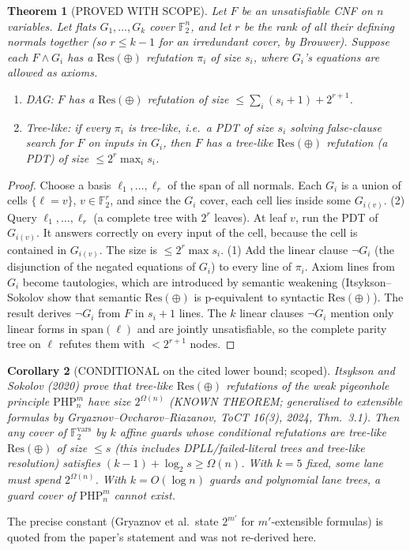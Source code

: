 \documentclass[11pt]{article}
\newtheorem{theorem}{Theorem}
\newtheorem{corollary}[theorem]{Corollary}
\theoremstyle{definition}
\newcommand{\F}{\mathbb{F}_2}
\newcommand{\Resx}{\mathrm{Res}(\oplus)}
\begin{document}
\begin{theorem}[PROVED WITH SCOPE]\label{thm:resx}
Let $F$ be an unsatisfiable CNF on $n$ variables. Let flats $G_1,\dots,G_k$ cover $\F^n$, and let $r$ be the rank of all their defining normals together (so $r\le k-1$ for an irredundant cover, by Brouwer). Suppose each $F\wedge G_i$ has a $\Resx$ refutation $\pi_i$ of size $s_i$, where $G_i$'s equations are allowed as axioms.
\begin{enumerate}
\item \emph{DAG:} $F$ has a $\Resx$ refutation of size $\le\sum_i(s_i+1)+2^{r+1}$.
\item \emph{Tree-like:} if every $\pi_i$ is tree-like, i.e.\ a PDT of size $s_i$ solving false-clause search for $F$ on inputs in $G_i$, then $F$ has a tree-like $\Resx$ refutation (a PDT) of size $\le 2^r\max_is_i$.
\end{enumerate}
\end{theorem}
\begin{proof}
Choose a basis $\ell_1,\dots,\ell_r$ of the span of all normals. Each $G_i$ is a union of cells $\{\ell=v\}$, $v\in\F^r$, and since the $G_i$ cover, each cell lies inside some $G_{i(v)}$.
(2) Query $\ell_1,\dots,\ell_r$ (a complete tree with $2^r$ leaves). At leaf $v$, run the PDT of $G_{i(v)}$. It answers correctly on every input of the cell, because the cell is contained in $G_{i(v)}$. The size is $\le 2^r\max s_i$.
(1) Add the linear clause $\neg G_i$ (the disjunction of the negated equations of $G_i$) to every line of $\pi_i$. Axiom lines from $G_i$ become tautologies, which are introduced by semantic weakening (Itsykson--Sokolov show that semantic $\Resx$ is p-equivalent to syntactic $\Resx$). The result derives $\neg G_i$ from $F$ in $s_i+1$ lines. The $k$ linear clauses $\neg G_i$ mention only linear forms in $\mathrm{span}(\ell)$ and are jointly unsatisfiable, so the complete parity tree on $\ell$ refutes them with $<2^{r+1}$ nodes.
\end{proof}

\begin{corollary}[CONDITIONAL on the cited lower bound; scoped]\label{cor:php}
Itsykson and Sokolov (2020) prove that tree-like $\Resx$ refutations of the weak pigeonhole principle $\mathrm{PHP}^m_n$ have size $2^{\Omega(n)}$ (KNOWN THEOREM; generalised to extensible formulas by Gryaznov--Ovcharov--Riazanov, ToCT 16(3), 2024, Thm.~3.1). Then any cover of $\F^{\mathrm{vars}}$ by $k$ affine guards whose conditional refutations are tree-like $\Resx$ of size $\le s$ (this includes DPLL/failed-literal trees and tree-like resolution) satisfies $(k-1)+\log_2 s\ge\Omega(n)$. With $k=5$ fixed, some lane must spend $2^{\Omega(n)}$. With $k=O(\log n)$ guards and polynomial lane trees, a guard cover of $\mathrm{PHP}^m_n$ cannot exist.
\end{corollary}
\noindent The precise constant (Gryaznov et al.\ state $2^{m'}$ for $m'$-extensible formulas) is quoted from the paper's statement and was not re-derived here.
\end{document}
